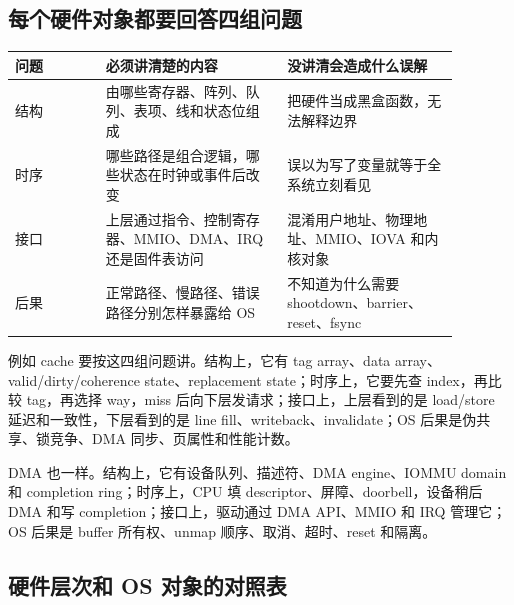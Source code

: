 
\subsection{每个硬件对象都要回答四组问题}

\begin{longtable}{p{0.18\linewidth}p{0.36\linewidth}p{0.34\linewidth}}
\toprule
问题 & 必须讲清楚的内容 & 没讲清会造成什么误解 \\
\midrule
结构 & 由哪些寄存器、阵列、队列、表项、线和状态位组成 & 把硬件当成黑盒函数，无法解释边界 \\
时序 & 哪些路径是组合逻辑，哪些状态在时钟或事件后改变 & 误以为写了变量就等于全系统立刻看见 \\
接口 & 上层通过指令、控制寄存器、MMIO、DMA、IRQ 还是固件表访问 & 混淆用户地址、物理地址、MMIO、IOVA 和内核对象 \\
后果 & 正常路径、慢路径、错误路径分别怎样暴露给 OS & 不知道为什么需要 shootdown、barrier、reset、fsync \\
\bottomrule
\end{longtable}

例如 cache 要按这四组问题讲。结构上，它有 tag array、data array、valid/dirty/coherence state、replacement state；时序上，它要先查 index，再比较 tag，再选择 way，miss 后向下层发请求；接口上，上层看到的是 load/store 延迟和一致性，下层看到的是 line fill、writeback、invalidate；OS 后果是伪共享、锁竞争、DMA 同步、页属性和性能计数。

DMA 也一样。结构上，它有设备队列、描述符、DMA engine、IOMMU domain 和 completion ring；时序上，CPU 填 descriptor、屏障、doorbell，设备稍后 DMA 和写 completion；接口上，驱动通过 DMA API、MMIO 和 IRQ 管理它；OS 后果是 buffer 所有权、unmap 顺序、取消、超时、reset 和隔离。

\subsection{硬件层次和 OS 对象的对照表}

